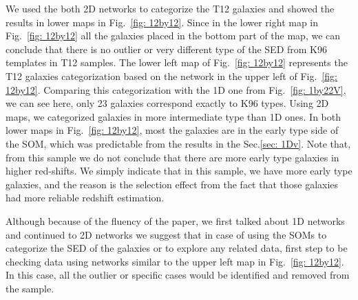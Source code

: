     We used the both 2D networks to categorize the T12 galaxies and showed the results in lower maps in Fig.~\ref{fig: 12by12}.
    Since in the lower right map in Fig.~\ref{fig: 12by12} all the galaxies placed in the bottom part of the map, we can conclude that there is no outlier or very different type of the SED from K96 templates in T12 samples.
    The lower left map of Fig.~\ref{fig: 12by12} represents the T12 galaxies categorization based on the network in the upper left of Fig.~\ref{fig: 12by12}. 
    Comparing this categorization with the 1D one from Fig.~\ref{fig: 1by22V}, we can see here, only 23 galaxies correspond exactly to K96 types.
    Using 2D maps, we categorized galaxies in more intermediate type than 1D ones.
    In both lower maps in Fig.~\ref{fig: 12by12}, most the galaxies are in the early type side of the SOM, which was predictable from the results in the Sec.\ref{sec: 1Dv}.
    Note that, from this sample we do not conclude that there are more early type galaxies in higher red-shifts.
    We simply indicate that in this sample, we have more early type galaxies, and the reason is the selection effect from the fact that those galaxies had more reliable redshift estimation. %
    
    Although because of the fluency of the paper, we first talked about 1D networks and continued to 2D networks we suggest that in case of using the SOMs to categorize the SED of the galaxies or to explore any related data, first step to be checking data using networks similar to the upper left map in Fig.~\ref{fig: 12by12}.
    In this case, all the outlier or specific cases would be identified and removed from the sample. 

    
    
    